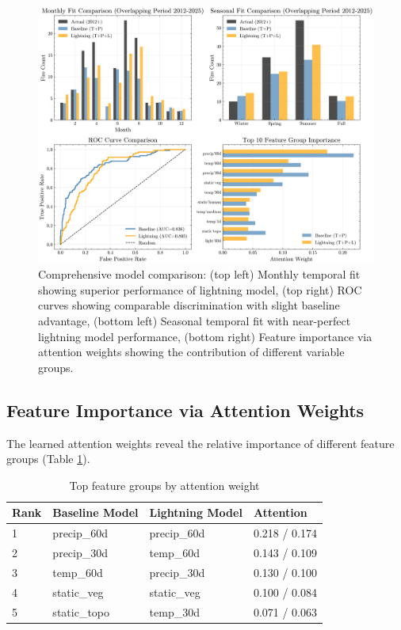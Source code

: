 \documentclass[11pt,a4paper]{article}
\begin{document}
\begin{figure}[H]
\centering
\includegraphics[width=\textwidth]{../output/figures/model_comparison.png}
\caption{Comprehensive model comparison: (top left) Monthly temporal fit showing superior performance of lightning model, (top right) ROC curves showing comparable discrimination with slight baseline advantage, (bottom left) Seasonal temporal fit with near-perfect lightning model performance, (bottom right) Feature importance via attention weights showing the contribution of different variable groups.}
\label{fig:model_comparison}
\end{figure}

\subsection{Feature Importance via Attention Weights}

The learned attention weights reveal the relative importance of different feature groups (Table \ref{tab:attention}).

\begin{table}[H]
\centering
\caption{Top feature groups by attention weight}
\label{tab:attention}
\begin{tabular}{llll}
\toprule
\textbf{Rank} & \textbf{Baseline Model} & \textbf{Lightning Model} & \textbf{Attention} \\
\midrule
1 & precip\_60d & precip\_60d & 0.218 / 0.174 \\
2 & precip\_30d & temp\_60d & 0.143 / 0.109 \\
3 & temp\_60d & precip\_30d & 0.130 / 0.100 \\
4 & static\_veg & static\_veg & 0.100 / 0.084 \\
5 & static\_topo & temp\_30d & 0.071 / 0.063 \\
\bottomrule
\end{tabular}
\end{table}
\end{document}
